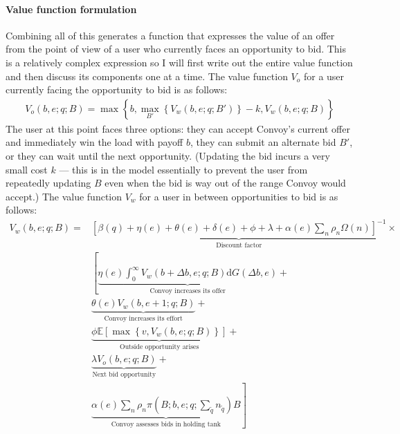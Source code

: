 \documentclass[12pt]{article}
\begin{document}
\paragraph{Value function formulation}
Combining all of this generates a function that expresses the value of an offer from the point of view of a user who currently faces an opportunity to bid. This is a relatively complex expression so I will first write out the entire value function and then discuss its components one at a time. The value function $V_o$ for a user currently facing the opportunity to bid is as follows:
\begin{align*}
    V_o\left(b,e;q;B\right) = \max \left\{b, \max_{B'} \left\{V_w\left(b,e;q;B'\right)\right\} -k, V_w\left(b,e;q;B\right) \right\}
\end{align*}
The user at this point faces three options: they can accept Convoy's current offer and immediately win the load with payoff $b$, they can submit an alternate bid $B'$, or they can wait until the next opportunity. (Updating the bid incurs a very small cost $k$ --- this is in the model essentially to prevent the user from repeatedly updating $B$ even when the bid is way out of the range Convoy would accept.) The value function $V_w$ for a user in between opportunities to bid is as follows:
\begin{align*}
V_w\left(b,e;q;B\right) = & \underbrace{\left[\beta\left(q\right) + \eta\left(e\right) + \theta\left(e\right) + \delta\left(e\right) + \phi + \lambda + \alpha\left(e\right) \sum_n \rho_n  \Omega\left(n\right) \right]^{-1}}_{\text{Discount factor}} \times \\
   & \left[ \underbrace{\eta\left(e\right) \int_{0}^{\infty} V_w\left(b+\Delta b,e;q;B\right) \mathrm{d}G\left(\Delta b, e\right)}_{\text{Convoy increases its offer}} + \right. \\ & \underbrace{\theta\left(e\right) V_w\left(b,e+1;q;B\right)}_{\text{Convoy increases its effort}}  + \\
   & \underbrace{\phi \mathbb{E}\left[ \max \left\{v,V_w\left(b,e;q;B\right)\right\} \right]}_{\text{Outside opportunity arises}}  + \\
    &  \underbrace{\lambda V_o\left(b,e;q;B\right)}_{\text{Next bid opportunity}} + \\
    & \left. \underbrace{\alpha\left(e\right) \sum_n \rho_n  \pi\left(B; b, e; q; \sum_{\tilde{q}} n_{\tilde{q}}\right) B }_{\text{Convoy assesses bids in holding tank}} \right] 
\end{align*}
\end{document}
